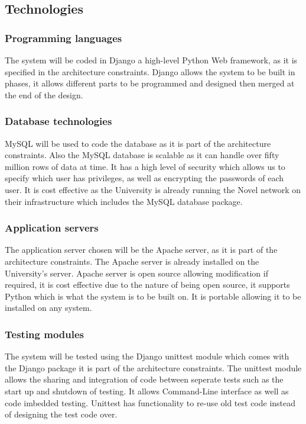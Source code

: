 \topmargin=-0.45in
\evensidemargin=0in
\oddsidemargin=0in
\textwidth=6.5in
\textheight=9.0in
\headsep=0.25in

\linespread{1.1} %
\subsection{Technologies}
\subsubsection{Programming languages}

The system will be coded in Django a high-level Python Web framework, as it is specified in the architecture constraints. Django allows the system to be built in phases, it allows different parts to be programmed and designed then merged at the end of the design. 

\subsubsection{Database technologies}

MySQL will be used to code the database as it is part of the architecture constraints. Also the MySQL database is scalable as it can handle over fifty million rows of data at time. It has a high level of security which allows us to specify which user has privileges, as well as encrypting the passwords of each user. It is cost effective as the University is already running the Novel network on their infrastructure which includes the MySQL database package. 

\subsubsection{Application servers}

The application server chosen will be the Apache server, as it is part of the architecture constraints. The Apache server is already installed on the University's server. Apache server is open source allowing modification if required, it is cost effective due to the nature of being open source, it supports Python which is what the system is to be built on. It is portable allowing it to be installed on any system.

\subsubsection{Testing modules}

The system will be tested using the Django unittest module which comes with the Django package it is part of the architecture constraints. The unittest module allows the sharing and integration of code between seperate tests such as the start up and shutdown of testing. It allows Command-Line interface as well as code imbedded testing. Unittest has functionality to re-use old test code instead of designing the test code over. 

